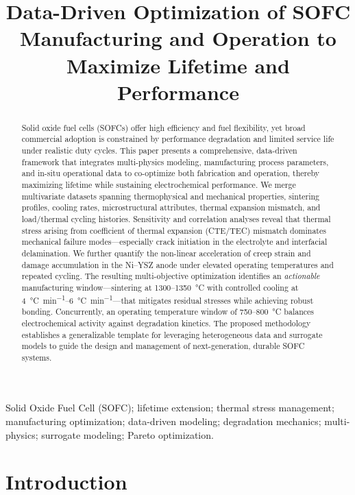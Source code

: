 \documentclass[conference]{IEEEtran}
\title{Data-Driven Optimization of SOFC Manufacturing and Operation to Maximize Lifetime and Performance}
\author{\IEEEauthorblockN{Author Name\IEEEauthorrefmark{1}, Author Name\IEEEauthorrefmark{2}}
\IEEEauthorblockA{\IEEEauthorrefmark{1}Affiliation One, City, Country\\
Email: author1@example.com}
\IEEEauthorblockA{\IEEEauthorrefmark{2}Affiliation Two, City, Country\\
Email: author2@example.com}}
\begin{document}
\maketitle

\begin{abstract}
Solid oxide fuel cells (SOFCs) offer high efficiency and fuel flexibility, yet broad commercial adoption is constrained by performance degradation and limited service life under realistic duty cycles. This paper presents a comprehensive, data-driven framework that integrates multi-physics modeling, manufacturing process parameters, and in-situ operational data to co-optimize both fabrication and operation, thereby maximizing lifetime while sustaining electrochemical performance. We merge multivariate datasets spanning thermophysical and mechanical properties, sintering profiles, cooling rates, microstructural attributes, thermal expansion mismatch, and load/thermal cycling histories. Sensitivity and correlation analyses reveal that thermal stress arising from coefficient of thermal expansion (CTE/TEC) mismatch dominates mechanical failure modes—especially crack initiation in the electrolyte and interfacial delamination. We further quantify the non-linear acceleration of creep strain and damage accumulation in the Ni–YSZ anode under elevated operating temperatures and repeated cycling. The resulting multi-objective optimization identifies an \emph{actionable} manufacturing window—sintering at \SI{1300}{}–\SI{1350}{\celsius} with controlled cooling at \SIrange{4}{6}{\celsius\per\minute}—that mitigates residual stresses while achieving robust bonding. Concurrently, an operating temperature window of \SI{750}{}–\SI{800}{\celsius} balances electrochemical activity against degradation kinetics. The proposed methodology establishes a generalizable template for leveraging heterogeneous data and surrogate models to guide the design and management of next-generation, durable SOFC systems.
\end{abstract}

\begin{IEEEkeywords}
Solid Oxide Fuel Cell (SOFC); lifetime extension; thermal stress management; manufacturing optimization; data-driven modeling; degradation mechanics; multi-physics; surrogate modeling; Pareto optimization.
\end{IEEEkeywords}

\section{Introduction}
\end{document}
